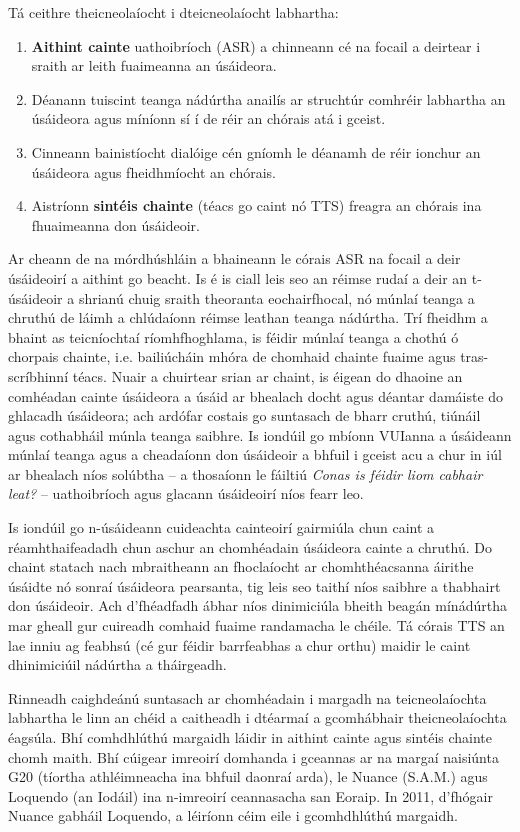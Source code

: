 \begin{multicols}{2}
Tá ceithre theicneolaíocht i dteicneolaíocht labhartha:

\begin{enumerate}
\item \textbf {Aithint cainte} uathoibríoch (ASR) a chinneann cé na focail a deirtear i sraith ar leith fuaimeanna an úsáideora.
\item Déanann tuiscint teanga nádúrtha anailís ar struchtúr comhréir labhartha an úsáideora agus míníonn sí í de réir an chórais atá i gceist.
\item Cinneann bainistíocht dialóige cén gníomh le déanamh de réir ionchur an úsáideora agus fheidhmíocht an chórais.    
\item Aistríonn \textbf{sintéis chainte} (téacs go caint nó TTS) freagra an chórais ina fhuaimeanna don úsáideoir.
\end{enumerate}

Ar cheann de na mórdhúshláin a bhaineann le córais ASR na focail a deir úsáideoirí a aithint go beacht. Is é is ciall leis seo an réimse rudaí a deir an t-úsáideoir a shrianú chuig sraith theoranta eochairfhocal, nó múnlaí teanga a chruthú de láimh a chlúdaíonn réimse leathan teanga nádúrtha. Trí fheidhm a bhaint as teicníochtaí ríomhfhoghlama, is féidir múnlaí teanga a chothú ó chorpais chainte, i.e. bailiúcháin mhóra de chomhaid chainte fuaime agus tras-scríbhinní téacs. Nuair a chuirtear srian ar chaint, is éigean do dhaoine an comhéadan cainte úsáideora a úsáid ar bhealach docht agus déantar damáiste do ghlacadh úsáideora; ach ardófar costais go suntasach de bharr cruthú, tiúnáil agus cothabháil múnla teanga saibhre. Is iondúil go mbíonn VUIanna a úsáideann múnlaí teanga agus a cheadaíonn don úsáideoir a bhfuil i gceist acu a chur in iúl ar bhealach níos solúbtha – a thosaíonn le fáiltiú \textit{Conas is féidir liom cabhair leat?} – uathoibríoch agus glacann úsáideoirí níos fearr leo. 

Is iondúil go n-úsáideann cuideachta cainteoirí gairmiúla chun caint a réamhthaifeadadh chun aschur an chomhéadain úsáideora cainte a chruthú. Do chaint statach nach mbraitheann an fhoclaíocht ar chomhthéacsanna áirithe úsáidte nó sonraí úsáideora pearsanta, tig leis seo taithí níos saibhre a thabhairt don úsáideoir. Ach d’fhéadfadh ábhar níos dinimiciúla bheith beagán mínádúrtha mar gheall gur cuireadh comhaid fuaime randamacha le chéile. Tá córais TTS an lae inniu ag feabhsú (cé gur féidir barrfeabhas a chur orthu) maidir le caint dhinimiciúil nádúrtha a tháirgeadh. 

Rinneadh caighdeánú suntasach ar chomhéadain i margadh na teicneolaíochta labhartha le linn an chéid a caitheadh i dtéarmaí a gcomhábhair theicneolaíochta éagsúla. Bhí comhdhlúthú margaidh láidir in aithint cainte agus sintéis chainte chomh maith. Bhí cúigear imreoirí domhanda i gceannas ar na margaí naisiúnta G20 (tíortha athléimneacha ina bhfuil daonraí arda), le Nuance (S.A.M.) agus Loquendo (an Iodáil) ina n-imreoirí ceannasacha san Eoraip.  In 2011, d’fhógair Nuance gabháil Loquendo, a léiríonn céim eile i gcomhdhlúthú margaidh.


\end{multicols}
